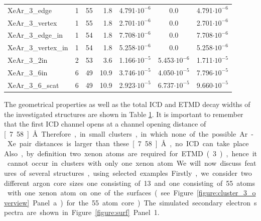 \begin{table}[h]
\begin{tabular}{lrrrccc}
XeAr\_3\_edge        &      1   &     55   &  1.8  & 4.791$\cdot 10^{-6}$ & 0.0                  & 4.791$\cdot 10^{-6}$ \\
XeAr\_3\_vertex      &      1   &     55   &  1.8  & 2.701$\cdot 10^{-6}$ & 0.0                  & 2.701$\cdot 10^{-6}$ \\
XeAr\_3\_edge\_in    &      1   &     54   &  1.8  & 7.708$\cdot 10^{-6}$ & 0.0                  & 7.708$\cdot 10^{-6}$ \\
XeAr\_3\_vertex\_in  &      1   &     54   &  1.8  & 5.258$\cdot 10^{-6}$ & 0.0                  & 5.258$\cdot 10^{-6}$ \\
XeAr\_3\_2in         &      2   &     53   &  3.6  & 1.166$\cdot 10^{-5}$ & 5.453$\cdot 10^{-6}$ & 1.711$\cdot 10^{-5}$ \\
XeAr\_3\_6in         &      6   &     49   & 10.9  & 3.746$\cdot 10^{-5}$ & 4.050$\cdot 10^{-5}$ & 7.796$\cdot 10^{-5}$ \\
XeAr\_3\_6\_scat     &      6   &     49   & 10.9  & 2.923$\cdot 10^{-5}$ & 6.737$\cdot 10^{-5}$ & 9.660$\cdot 10^{-5}$ \\
\bottomrule
\end{tabular}
\label{table:theo_gammas}
\end{table}
%
The geometrical properties as well as the total ICD and ETMD decay widths
of the investigated structures are shown in Table \ref{table:theo_gammas}.
It is important to remember that the first ICD channel opens at a
channel opening distance of \unit[7.58]{\AA}. Therefore, in small
clusters, in which none of the possible Ar-Xe pair distances is larger than
these \unit[7.58]{\AA}, no ICD can take place. Also, by definition two xenon atoms are
required for ETMD(3), hence it cannot occur in clusters with only one xenon atom.
%

We will now discuss features of several structures, using selected examples.

Firstly, we consider two different argon core sizes one consisting
of 13 and one consisting of 55 atoms with one xenon atom on one of
the surfaces (see Figure \ref{figure:cluster_3_overview} Panel a)
for the 55 atom core). The simulated secondary electron spectra are
shown in Figure \ref{figure:surf} Panel 1.

